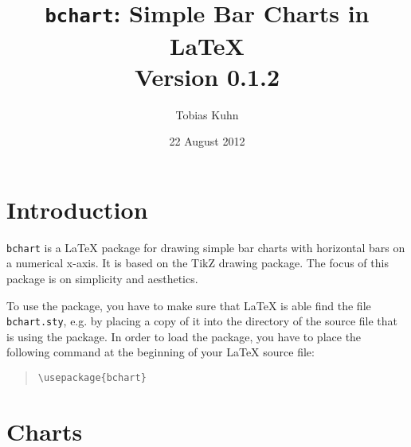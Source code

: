 \documentclass{article}
\title{
  \texttt{bchart}: Simple Bar Charts in \LaTeX
  \medskip\\
  \large Version 0.1.2
}
\author{Tobias Kuhn}
\date{22 August 2012}
\begin{document}
\maketitle


\section{Introduction}

\texttt{bchart} is a {\LaTeX} package for drawing simple bar charts with horizontal bars on a numerical x-axis. It is based on the TikZ drawing package. The focus of this package is on simplicity and aesthetics.

To use the package, you have to make sure that {\LaTeX} is able find the file \texttt{bchart.sty}, e.g. by placing a copy of it into the directory of the source file that is using the package. In order to load the package, you have to place the following command at the beginning of your {\LaTeX} source file:
\begin{quote}\small
\begin{verbatim}
\usepackage{bchart}
\end{verbatim}
\end{quote}


\section{Charts}
\end{document}
